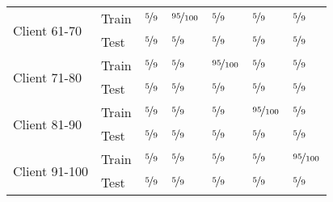 \begin{tabular}{lllllll}
\cline{1-7}
\multirow{2}{*}{Client 61-70} & Train &  $\nicefrac{{5}}{{9}}$ &  $\nicefrac{{95}}{{100}}$ &  $\nicefrac{{5}}{{9}}$ &  $\nicefrac{{5}}{{9}}$ &  $\nicefrac{{5}}{{9}}$ \\
                  & Test  &  $\nicefrac{{5}}{{9}}$ &  $\nicefrac{{5}}{{9}}$ &  $\nicefrac{{5}}{{9}}$ &  $\nicefrac{{5}}{{9}}$ &  $\nicefrac{{5}}{{9}}$ \\
\cline{1-7}
\multirow{2}{*}{Client 71-80} & Train &  $\nicefrac{{5}}{{9}}$ &  $\nicefrac{{5}}{{9}}$ &  $\nicefrac{{95}}{{100}}$ &  $\nicefrac{{5}}{{9}}$ &  $\nicefrac{{5}}{{9}}$ \\
                  & Test  &  $\nicefrac{{5}}{{9}}$ &  $\nicefrac{{5}}{{9}}$ &  $\nicefrac{{5}}{{9}}$ &  $\nicefrac{{5}}{{9}}$ &  $\nicefrac{{5}}{{9}}$ \\
\cline{1-7}
\multirow{2}{*}{Client 81-90} & Train &  $\nicefrac{{5}}{{9}}$ &  $\nicefrac{{5}}{{9}}$ &  $\nicefrac{{5}}{{9}}$ &  $\nicefrac{{95}}{{100}}$ &  $\nicefrac{{5}}{{9}}$ \\
                  & Test  &  $\nicefrac{{5}}{{9}}$ &  $\nicefrac{{5}}{{9}}$ &  $\nicefrac{{5}}{{9}}$ &  $\nicefrac{{5}}{{9}}$ &  $\nicefrac{{5}}{{9}}$ \\
\cline{1-7}
\multirow{2}{*}{Client 91-100} & Train & $\nicefrac{{5}}{{9}}$ & $\nicefrac{{5}}{{9}}$ & $\nicefrac{{5}}{{9}}$ & $\nicefrac{{5}}{{9}}$ & $\nicefrac{{95}}{{100}}$ \\
              & Test & $\nicefrac{{5}}{{9}}$ & $\nicefrac{{5}}{{9}}$ & $\nicefrac{{5}}{{9}}$ & $\nicefrac{{5}}{{9}}$ & $\nicefrac{{5}}{{9}}$ \\
\bottomrule
\end{tabular}
